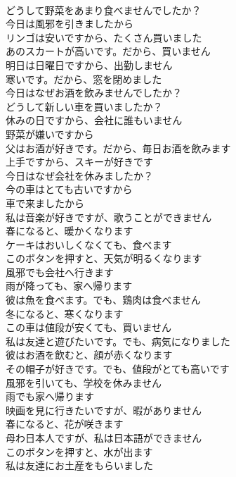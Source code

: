 \documentclass[8pt]{extreport}
\begin{document}
\begin{CJK}{UTF8}{min}
\\	どうして野菜をあまり食べませんでしたか？	
\\	今日は風邪を引きましたから	
\\	リンゴは安いですから、たくさん買いました	
\\	あのスカートが高いです。だから、買いません	
\\	明日は日曜日ですから、出勤しません	
\\	寒いです。だから、窓を閉めました	
\\	今日はなぜお酒を飲みませんでしたか？	
\\	どうして新しい車を買いましたか？	
\\	休みの日ですから、会社に誰もいません	
\\	野菜が嫌いですから	
\\	父はお酒が好きです。だから、毎日お酒を飲みます	
\\	上手ですから、スキーが好きです	
\\	今日はなぜ会社を休みましたか？	
\\	今の車はとても古いですから	
\\	車で来ましたから	
\\	私は音楽が好きですが、歌うことができません	
\\	春になると、暖かくなります	
\\	ケーキはおいしくなくても、食べます	
\\	このボタンを押すと、天気が明るくなります	
\\	風邪でも会社へ行きます	
\\	雨が降っても、家へ帰ります	
\\	彼は魚を食べます。でも、鶏肉は食べません	
\\	冬になると、寒くなります	
\\	この車は値段が安くても、買いません	
\\	私は友達と遊びたいです。でも、病気になりました	
\\	彼はお酒を飲むと、顔が赤くなります	
\\	その帽子が好きです。でも、値段がとても高いです	
\\	風邪を引いても、学校を休みません	
\\	雨でも家へ帰ります	
\\	映画を見に行きたいですが、暇がありません	
\\	春になると、花が咲きます	
\\	母わ日本人ですが、私は日本語ができません	
\\	このボタンを押すと、水が出ます	
\\	私は友達にお土産をもらいました	

\end{CJK}
\end{document}
